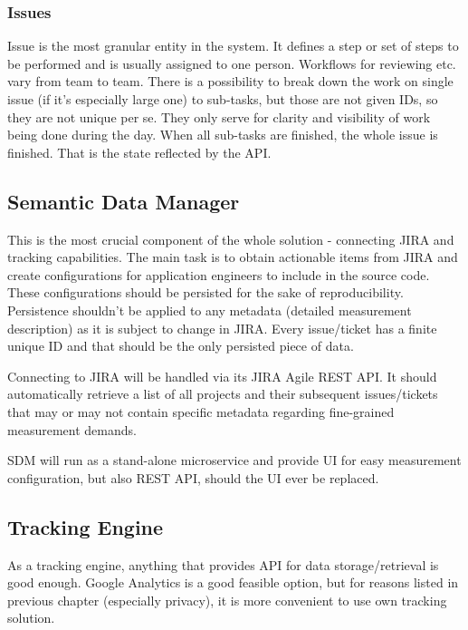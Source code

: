 \subsubsection{Issues}

Issue is the most granular entity in the system. It defines a step or set of steps to be performed and is usually assigned to one person. Workflows for reviewing etc. vary from team to team. There is a possibility to break down the work on single issue (if it's especially large one) to sub-tasks, but those are not given IDs, so they are not unique per se. They only serve for clarity and visibility of work being done during the day. When all sub-tasks are finished, the whole issue is finished. That is the state reflected by the API.

\subsection{Semantic Data Manager}

This is the most crucial component of the whole solution - connecting JIRA and tracking capabilities. The main task is to obtain actionable items from JIRA and create configurations for application engineers to include in the source code. These configurations should be persisted for the sake of reproducibility. Persistence shouldn't be applied to any metadata (detailed measurement description) as it is subject to change in JIRA. Every issue/ticket has a finite unique ID and that should be the only persisted piece of data.

Connecting to JIRA will be handled via its JIRA Agile REST API. It should automatically retrieve a list of all projects and their subsequent issues/tickets that may or may not contain specific metadata regarding fine-grained measurement demands.

SDM will run as a stand-alone microservice and provide UI for easy measurement configuration, but also REST API, should the UI ever be replaced.


\subsection{Tracking Engine}

As a tracking engine, anything that provides API for data storage/retrieval is good enough. Google Analytics is a good feasible option, but for reasons listed in previous chapter (especially privacy), it is more convenient to use own tracking solution.


